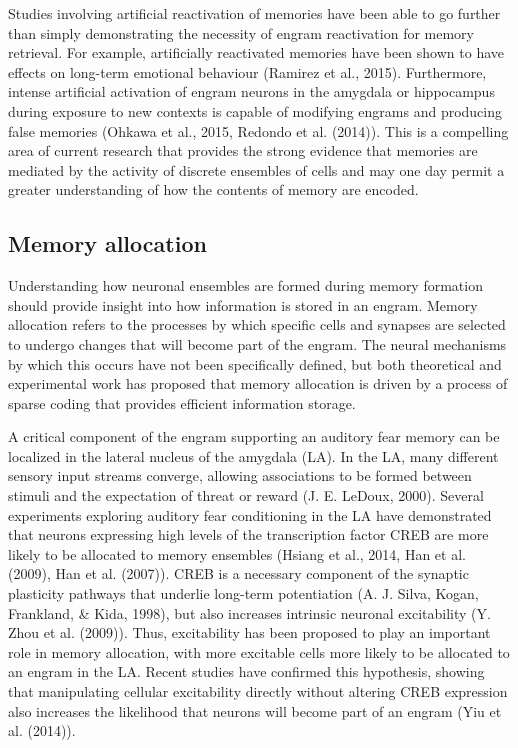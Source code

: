 \documentclass[12pt,a4paper,]{report}
\begin{document}
Studies involving artificial reactivation of memories have been able to
go further than simply demonstrating the necessity of engram
reactivation for memory retrieval. For example, artificially reactivated
memories have been shown to have effects on long-term emotional
behaviour (Ramirez et al., 2015). Furthermore, intense artificial
activation of engram neurons in the amygdala or hippocampus during
exposure to new contexts is capable of modifying engrams and producing
false memories (Ohkawa et al., 2015, Redondo et al. (2014)). This is a
compelling area of current research that provides the strong evidence
that memories are mediated by the activity of discrete ensembles of
cells and may one day permit a greater understanding of how the contents
of memory are encoded.

\subsection{Memory allocation}\label{memory-allocation}

Understanding how neuronal ensembles are formed during memory formation
should provide insight into how information is stored in an engram.
Memory allocation refers to the processes by which specific cells and
synapses are selected to undergo changes that will become part of the
engram. The neural mechanisms by which this occurs have not been
specifically defined, but both theoretical and experimental work has
proposed that memory allocation is driven by a process of sparse coding
that provides efficient information storage.

A critical component of the engram supporting an auditory fear memory
can be localized in the lateral nucleus of the amygdala (LA). In the LA,
many different sensory input streams converge, allowing associations to
be formed between stimuli and the expectation of threat or reward (J. E.
LeDoux, 2000). Several experiments exploring auditory fear conditioning
in the LA have demonstrated that neurons expressing high levels of the
transcription factor CREB are more likely to be allocated to memory
ensembles (Hsiang et al., 2014, Han et al. (2009), Han et al. (2007)).
CREB is a necessary component of the synaptic plasticity pathways that
underlie long-term potentiation (A. J. Silva, Kogan, Frankland, \& Kida,
1998), but also increases intrinsic neuronal excitability (Y. Zhou et
al. (2009)). Thus, excitability has been proposed to play an important
role in memory allocation, with more excitable cells more likely to be
allocated to an engram in the LA. Recent studies have confirmed this
hypothesis, showing that manipulating cellular excitability directly
without altering CREB expression also increases the likelihood that
neurons will become part of an engram (Yiu et al. (2014)).
\end{document}

